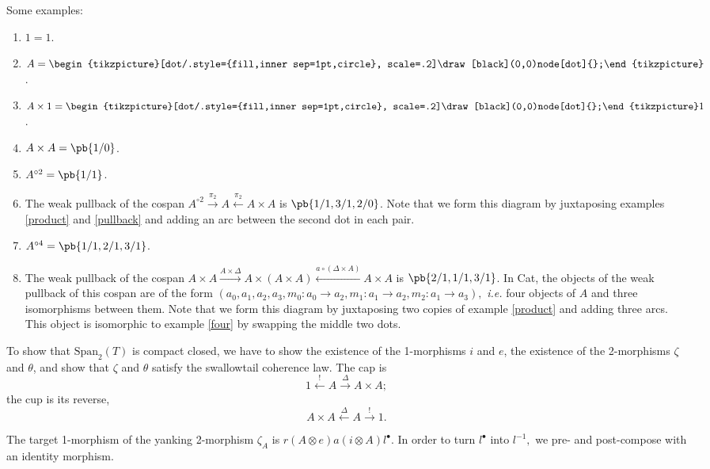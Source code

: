 \documentclass[12pt,twoside,openright]{report}
\newcommand{\maps}{\colon}
\newcommand{\Span}{\mbox{Span}}
\begin{document}
Some examples:
\begin{enumerate}
  \item $1 = 1$.
  \item $A = \begin{tikzpicture}[dot/.style={fill,inner sep=1pt,circle}, scale=.2]\draw[black](0,0)node[dot]{};\end{tikzpicture}$.
  \item $A \times 1 = \begin{tikzpicture}[dot/.style={fill,inner sep=1pt,circle}, scale=.2]\draw[black](0,0)node[dot]{};\end{tikzpicture} 1$.
  \item \label{product} $A \times A = \pb{1/0}$.
  \item \label{pullback} $A^{\circ 2} = \pb{1/1}$.
  \item The weak pullback of the cospan $A^{\circ 2} \stackrel{\pi_2}{\to} A \stackrel{\pi_2}{\leftarrow} A\times A$ is $\pb{1/1,3/1,2/0}$.  Note that we form this diagram by juxtaposing examples \ref{product} and \ref{pullback} and adding an arc between the second dot in each pair.
  \item \label{four} $A^{\circ 4} = \pb{1/1,2/1,3/1}$.
  \item The weak pullback of the cospan $A\times A \stackrel{A \times \Delta}{\to} A \times (A \times A) \stackrel{a \circ (\Delta \times A)}{\leftarrow} A\times A$ is $\pb{2/1,1/1,3/1}$.  In Cat, the objects of the weak pullback of this cospan are of the form $(a_0, a_1, a_2, a_3, m_0\maps a_0 \to a_2, m_1\maps a_1 \to a_2, m_2 \maps a_1 \to a_3),$ {\em i.e.} four objects of $A$ and three isomorphisms between them.  Note that we form this diagram by juxtaposing two copies of example \ref{product} and adding three arcs.  This object is isomorphic to example \ref{four} by swapping the middle two dots.
\end{enumerate}

To show that $\Span_2(T)$ is compact closed, we have to show the existence of the 1-morphisms $i$ and $e$, the existence of the 2-morphisms $\zeta$ and $\theta$, and show that $\zeta$ and $\theta$ satisfy the swallowtail coherence law.  The cap is $$1 \stackrel{!}{\leftarrow} A \stackrel{\Delta}{\to} A\times A;$$ the cup is its reverse, $$A\times A \stackrel{\Delta}{\leftarrow} A \stackrel{!}{\to} 1.$$  


The target 1-morphism of the yanking 2-morphism $\zeta_A$ is $r(A\otimes e)a(i\otimes A)l^\bullet.$  In order to turn $l^\bullet$ into $l^{-1},$ we pre- and post-compose with an identity morphism.  
\end{document}
